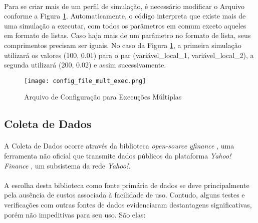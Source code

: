 \paragraph{} Para se criar mais de um perfil de simulação, é necessário modificar o Arquivo conforme a Figura \ref{fig:102}. Automaticamente, o código interpreta que existe mais de uma simulação a executar, com todos os parâmetros em comum exceto aqueles em formato de listas. Caso haja mais de um parâmetro no formato de lista, seus comprimentos precisam ser iguais. No caso da Figura \ref{fig:102}, a primeira simulação utilizará os valores (100, 0.01) para o par (variável\_local\_1, variável\_local\_2), a segunda utilizará (200, 0.02) e assim sucessivamente.

\begin{figure}[h]
    \texttt{[image: config\_file\_mult\_exec.png]}
    \centering
    \caption{Arquivo de Configuração para Execuções Múltiplas}
    \label{fig:102}
\end{figure}



\subsection{Coleta de Dados}
\label{coleta_de_dados}

\paragraph{} A Coleta de Dados ocorre através da biblioteca \textit{open-source} \textit{yfinance} \cite{yfinance}, uma ferramenta não oficial que transmite dados públicos da plataforma \textit{Yahoo! Finance} \cite{yahoo_finance}, um subsistema da rede \textit{Yahoo!}.

\paragraph{} A escolha desta biblioteca como fonte primária de dados se deve principalmente pela ausência de custos associada à facilidade de uso. Contudo, alguns testes e verificações com outras fontes de dados evidenciaram destantagens significativas, porém não impeditivas para seu uso. São elas:

